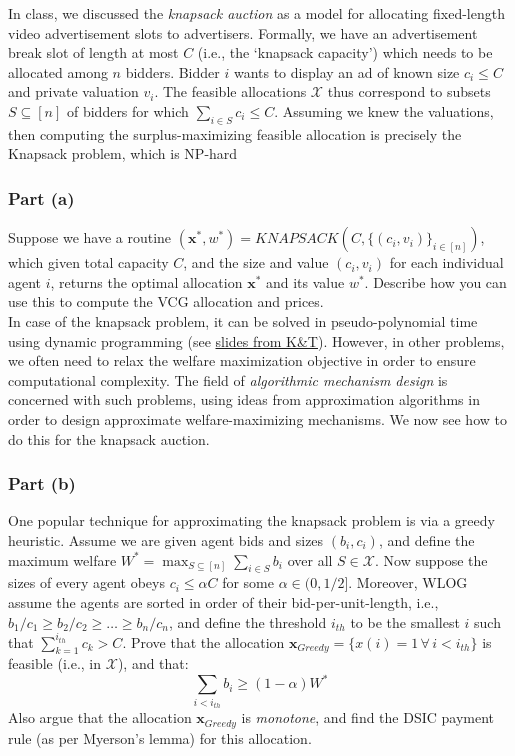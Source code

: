 \documentclass[letterpaper,11pt]{article}
\begin{document}
In class, we discussed the \emph{knapsack auction} as a model for allocating fixed-length video advertisement slots to advertisers. Formally, we have an advertisement break slot of length at most $C$ (i.e., the `knapsack capacity') which needs to be allocated among $n$ bidders. Bidder $i$ wants to display an ad of known size $c_i\leq C$ and private valuation $v_i$. The feasible allocations $\mathcal{X}$ thus correspond to subsets $S\subseteq [n]$ of bidders for which $\sum_{i\in S}c_i\leq C$. Assuming we knew the valuations, then computing the surplus-maximizing feasible allocation is precisely the Knapsack problem, which is NP-hard

\subsubsection*{Part (a)} 
Suppose we have a routine $(\mathbf{x}^*,w^*) = KNAPSACK(C,\{(c_i,v_i)\}_{i\in[n]})$, which given total capacity $C$, and the size and value $(c_i,v_i)$ for each individual agent $i$, returns the optimal allocation $\mathbf{x}^*$ and its value $w^*$. Describe how you can use this to compute the VCG allocation and prices.\\

In case of the knapsack problem, it can be solved in pseudo-polynomial time using dynamic programming (see \href{http://www.cs.princeton.edu/~wayne/kleinberg-tardos/pdf/06DynamicProgrammingI-2x2.pdf}{slides from K\&T}). However, in other problems, we often need to relax the welfare maximization objective in order to ensure computational complexity. The field of \emph{algorithmic mechanism design} is concerned with such problems, using ideas from approximation algorithms in order to design approximate welfare-maximizing mechanisms. We now see how to do this for the knapsack auction.

\subsubsection*{Part (b)} 
One popular technique for approximating the knapsack problem is via a greedy heuristic. Assume we are given agent bids and sizes $(b_i,c_i)$, and define the maximum welfare $W^* = \max_{S\subseteq[n]}\sum_{i\in S}b_i$ over all $S\in\mathcal{X}$. Now suppose the sizes of every agent obeys $c_i\leq\alpha C$ for some $\alpha\in (0,1/2]$. Moreover, WLOG assume the agents are sorted in order of their bid-per-unit-length, i.e., $b_1/c_1\geq b_2/c_2\geq \ldots\geq b_n/c_n$, and define the threshold $i_{th}$ to be the smallest $i$ such that $\sum_{k=1}^{i_{th}} c_k >C$. 
Prove that the allocation $\mathbf{x}_{Greedy} = \{x(i)=1\,\forall\, i< i_{th}\}$ is feasible (i.e., in $\mathcal{X}$), and that:
$$\sum_{i<i_{th}}b_i \geq (1-\alpha)W^*$$
Also argue that the allocation $\mathbf{x}_{Greedy}$ is \emph{monotone}, and find the DSIC payment rule (as per Myerson's lemma) for this allocation.
\end{document}
